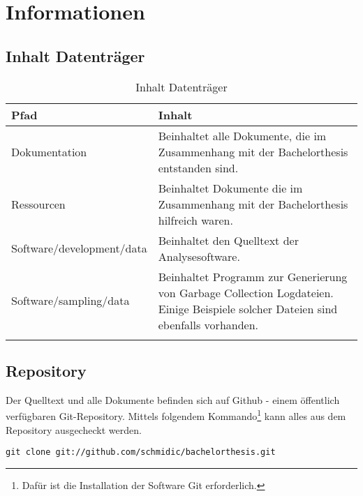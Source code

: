 \chapter{Informationen}

\section{Inhalt Datenträger}
  \begin{longtable}{|p{5cm}|p{8cm}|}
\hline
  \textbf{Pfad} & \textbf{Inhalt}\\\hline
    Dokumentation & Beinhaltet alle Dokumente, die im Zusammenhang mit der Bachelorthesis entstanden sind.\\\hline
    Ressourcen & Beinhaltet Dokumente die im Zusammenhang mit der Bachelorthesis hilfreich waren.\\\hline
    Software/development/data & Beinhaltet den Quelltext der Analysesoftware.\\\hline
    Software/sampling/data & Beinhaltet Programm zur Generierung von Garbage Collection Logdateien. Einige Beispiele solcher Dateien sind ebenfalls vorhanden.\\\hline
      \caption{Inhalt Datenträger}\\
  \end{longtable}

\section{Repository}
Der Quelltext und alle Dokumente befinden sich auf Github - einem öffentlich verfügbaren Git-Repository. Mittels folgendem Kommando\footnote{Dafür ist die Installation der Software Git erforderlich.} kann alles aus dem Repository ausgecheckt werden.

\begin{lstlisting}[caption=Checkout Quelltext Repository]
git clone git://github.com/schmidic/bachelorthesis.git
\end{lstlisting}



